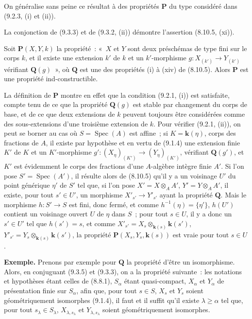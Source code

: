 On généralise sans peine ce résultat à des propriétés $\mathbf P$ du type
considéré dans (9.2.3, (i) et (ii)).

\begin{remark}[9.3.4]
\label{IV.9.3.4-fr}
La conjonction de (9.3.3) et de (9.3.2, (ii)) démontre l'assertion
(8.10.5, (xi)).
\end{remark}

\begin{proposition}[9.3.5]
\label{IV.9.3.5-fr}
Soit $\mathbf P(X,Y,k)$ la propriété~: «~$X$ et $Y$ sont deux préschémas de
type fini sur le corps $k$, et il existe une extension $k'$ de $k$ et un
$k'$-morphisme $g:X_{(k')}\to Y_{(k')}$ vérifiant $\mathbf Q(g)$~», où
$\mathbf Q$ est une des propriétés (i) à (xiv) de (8.10.5). Alors $\mathbf P$
est une propriété ind-constructible.
\end{proposition}

La définition de $\mathbf P$ montre en effet que la condition (9.2.1, (i))
est satisfaite, compte tenu de ce que la propriété $\mathbf Q(g)$ est stable
par changement du corps de base, et de ce que deux extensions de $k$ peuvent
toujours être considérées comme des sous-extensions d'une troisième extension
de $k$. Pour vérifier (9.2.1, (ii)), on peut se borner au cas où
$S=\operatorname{Spec}(A)$ est affine~; si $K=\mathbf{k}(\eta)$, corps des fractions de
$A$, il existe par hypothèse et en vertu de (9.1.4) une extension finie $K'$ de
$K$ et un $K'$-morphisme
$g':(X_\eta)_{(K')}\to(Y_\eta)_{(K')}$, vérifiant $\mathbf Q(g')$, et $K'$ est
évidemment le corps des fractions d'une $A$-algèbre intègre finie $A'$. Si
l'on pose $S'=\operatorname{Spec}(A')$, il résulte alors de (8.10.5) qu'il y
a un voisinage $U'$ du point générique $\eta'$ de $S'$ tel que, si l'on pose
$X'=X\otimes_A A'$, $Y'=Y\otimes_A A'$, il existe, pour tout $s'\in U'$, un
morphisme $X'_{s'}\to Y'_{s'}$ ayant la propriété $\mathbf Q$. Mais le
morphisme $h:S'\to S$ est fini, donc fermé, et comme
$h^{-1}(\eta)=\{\eta'\}$, $h(U')$ contient un voisinage ouvert $U$ de $\eta$
dans $S$~; pour tout $s\in U$, il y a donc un $s'\in U'$ tel que $h(s')=s$,
et comme
$X'_{s'}=X_s\otimes_{\mathbf{k}(s)}\mathbf{k}(s')$,
$Y'_{s'}=Y_s\otimes_{\mathbf{k}(s)}\mathbf{k}(s')$, la propriété
$\mathbf P(X_s,Y_s,\mathbf{k}(s))$ est vraie pour tout $s\in U$.

\begin{env}[9.3.6]
\label{IV.9.3.6-fr}
\textbf{Exemple.} Prenons par exemple pour $\mathbf Q$ la propriété d'être un
isomorphisme. Alors, en conjuguant (9.3.5) et (9.3.3), on a la propriété
suivante~: les notations et hypothèses étant celles de (8.8.1), $S_\alpha$
étant quasi-compact, $X_\alpha$ et $Y_\alpha$ de présentation finie sur
$S_\alpha$, afin que, pour tout $s\in S$, $X_s$ et $Y_s$ soient
géométriquement isomorphes (9.1.4), il faut et il suffit qu'il existe
$\lambda\geqslant\alpha$ tel que, pour tout $s_\lambda\in S_\lambda$,
$X_{\lambda,s_\lambda}$ et $Y_{\lambda,s_\lambda}$ soient géométriquement
isomorphes.
\end{env}

